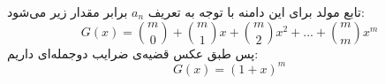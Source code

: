 \p
    تابع مولد برای این دامنه با توجه به تعریف 
    $a_{n}$
    برابر مقدار زیر می‌شود:
        $$G(x)= {m \choose 0} + {m \choose 1}x + {m \choose 2}x^{2} + ... + {m \choose m}x^{m}$$
    پس طبق عکس قضیه‌ی ضرایب دو‌جمله‌ای داریم:
    $$G(x)= (1+x)^{m}$$
